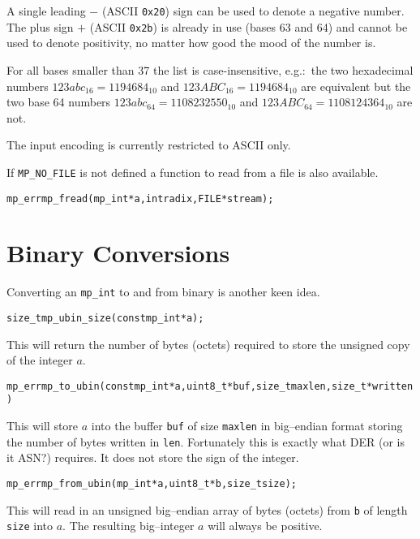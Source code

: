 \documentclass[synpaper]{book}
\begin{document}
A single leading $-$ (ASCII \texttt{0x20}) sign can be used to denote a negative number. The
plus sign $+$ (ASCII \texttt{0x2b}) is already in use (bases 63 and 64) and cannot be used
to denote positivity, no matter how good the mood of the number is.

For all bases smaller than 37 the list is case-insensitive, e.g.:~the two hexadecimal numbers
$123abc_{16} = 1194684_{10}$ and $123ABC_{16} = 1194684_{10}$ are equivalent but the two base
64 numbers $123abc_{64} = 1108232550_{10}$ and $123ABC_{64} = 1108124364_{10}$ are not.

The input encoding is currently restricted to ASCII only.

If \texttt{MP\_NO\_FILE} is not defined a function to read from a file is also available.
\begin{alltt}
mp_err mp_fread(mp_int *a, int radix, FILE *stream);
\end{alltt}

\section{Binary Conversions}

Converting an \texttt{mp\_int} to and from binary is another keen idea.

\begin{alltt}
size_t mp_ubin_size(const mp_int *a);
\end{alltt}

This will return the number of bytes (octets) required to store the unsigned copy of the integer
$a$.

\begin{alltt}
mp_err mp_to_ubin(const mp_int *a, uint8_t *buf, size_t maxlen, size_t *written)
\end{alltt}
This will store $a$ into the buffer \texttt{buf} of size \texttt{maxlen} in big--endian format
storing the number of bytes written in \texttt{len}.  Fortunately this is exactly what DER (or is
it ASN?) requires.  It does not store the sign of the integer.

\begin{alltt}
mp_err mp_from_ubin(mp_int *a, uint8_t *b, size_t size);
\end{alltt}
This will read in an unsigned big--endian array of bytes (octets) from \texttt{b} of length
\texttt{size} into $a$.  The resulting big--integer $a$ will always be positive.
\end{document}
